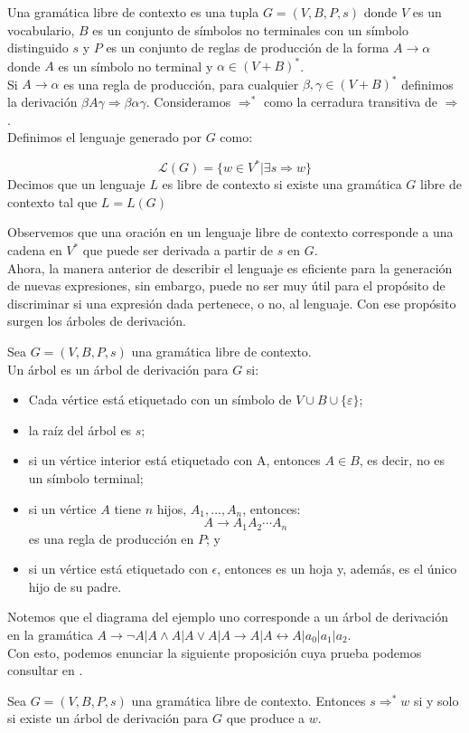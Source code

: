 \documentclass[../main.tex]{subfiles}
\begin{document}
\begin{dfn}
	
	Una gramática libre de contexto es una tupla $G=(V,B,P,s)$ donde $V$ es un vocabulario, $B$ es un conjunto de símbolos no terminales con un símbolo distinguido $s$ y $P$ es un conjunto de reglas de producción de la forma $A \to \alpha$ donde $A$ es un símbolo no terminal y $\alpha \in (V+B)^*$.\\
	Si $A \to \alpha$ es una regla de producción, para cualquier $\beta, \gamma \in (V+B)^*$ definimos la derivación 
	$\beta A \gamma \Rightarrow \beta \alpha \gamma$. 
	Consideramos $\Rightarrow ^*$ como la  cerradura transitiva de $\Rightarrow$. \\
    Definimos el lenguaje generado por $G$ como:
	
	$$ \mathcal{L}(G)= \{ w \in V^* | \exists s \Rightarrow w \} $$
	Decimos que un lenguaje $L$ es libre de contexto si existe una gramática $G$ libre de contexto tal que $L=L(G)$
\end{dfn}
Observemos que una oración en un lenguaje libre de contexto corresponde a una cadena en $V^*$ que puede ser derivada a partir de $s$ en $G$. \\
Ahora, la manera anterior de describir el lenguaje es eficiente para la generación de nuevas expresiones, sin embargo, puede no ser muy útil para el propósito de discriminar si una expresión dada pertenece, o no, al lenguaje. Con ese propósito surgen los árboles de derivación. 
\begin{dfn}
	Sea $G=(V,B,P,s)$ una gramática libre de contexto. \\
	Un árbol es un árbol de derivación para $G$ si:
	\begin{itemize}
		\item Cada vértice está etiquetado con un símbolo de $V \cup B \cup \{ \varepsilon \}$; 
		\item la raíz del árbol es $s$; 
		\item si un vértice interior está etiquetado con A, entonces $A \in B$, es decir, no es un símbolo terminal;
		\item si un vértice $A$ tiene $n$ hijos, $A_1, \dots, A_n$, entonces:
		$$A \to A_1A_2 \cdots A_n$$
		es una regla de producción en $P$; y
		\item si un vértice está etiquetado con $\epsilon$, entonces es un hoja y, además, es el único hijo de su padre.
	\end{itemize}
\end{dfn}
Notemos que el diagrama del ejemplo uno corresponde a un árbol de derivación en la gramática $A \to \neg A | A \land A | A \lor A | A \to A | A \leftrightarrow A|a_0|a_1|a_2 $.\\ 
Con esto, podemos enunciar la siguiente proposición cuya prueba podemos consultar en \cite{hopcroft01}. \\
\begin{prop}
	Sea $G=(V,B,P,s)$ una gramática libre de contexto. Entonces $s \Rightarrow ^* w$ si y solo si existe un árbol de derivación para $G$ que produce a $w$. 
\end{prop}
\end{document}
